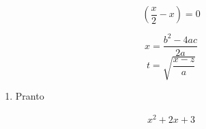 \documentclass[11pt, a4paper]{article}
\begin{document}
$$\left( \frac{x}{2} - x\right) = 0$$

$$x = \frac{b^2 - 4ac}{2a}$$
$$t = \sqrt{\frac{x-z}{a}}$$


\begin{enumerate}
    \item Pranto
    
\end{enumerate}

\begin{align*} %
x^2 + 2x + 3   %
\end{align*}
\end{document}
